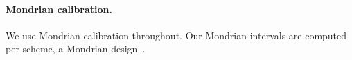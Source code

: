 \paragraph{Mondrian calibration.} We use Mondrian calibration throughout.
Our Mondrian intervals are computed per scheme, a Mondrian design~\cite{vovk2012conditional}.
